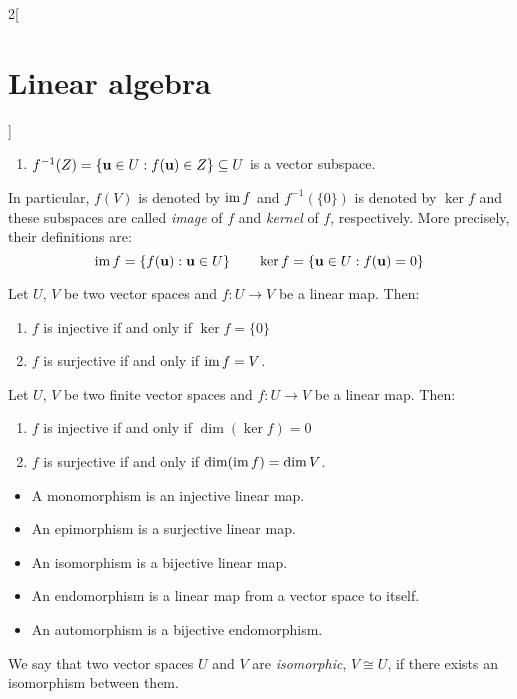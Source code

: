 \documentclass[../../../main.tex]{subfiles}
\begin{document}
\begin{multicols}{2}[\section{Linear algebra}]
\begin{prop}
\begin{enumerate}
      \item $f^{-1}(Z)=\{\boldsymbol{\mathrm{u}}\in U: f(\boldsymbol{\mathrm{u}})\in Z\}\subseteq U$ is a vector subspace.
    \end{enumerate}
    In particular, $f(V)$ is denoted by $\operatorname{im} f$ and $f^{-1}(\{0\})$ is denoted by $\ker f$ and these subspaces are called \emph{image} of $f$ and \emph{kernel} of $f$, respectively. More precisely, their definitions are:
    $$\operatorname{im} f=\{f(\boldsymbol{\mathrm{u}}): \boldsymbol{\mathrm{u}}\in U\}\qquad\ker f=\{\boldsymbol{\mathrm{u}}\in U: f(\boldsymbol{\mathrm{u}})=0\}$$
  \end{prop}
  \begin{prop}
    Let $U$, $V$ be two vector spaces and $f:U\rightarrow V$ be a linear map. Then:
    \begin{enumerate}
      \item $f$ is injective if and only if $\ker f=\{0\}$
      \item $f$ is surjective if and only if $\operatorname{im} f=V$.
    \end{enumerate}
  \end{prop}
  \begin{corollary}
    Let $U$, $V$ be two finite vector spaces and $f:U\rightarrow V$ be a linear map. Then:
    \begin{enumerate}
      \item $f$ is injective if and only if $\dim(\ker f)=0$
      \item $f$ is surjective if and only if $\dim(\operatorname{im} f)=\dim V$.
    \end{enumerate}
  \end{corollary}
  \begin{definition}
    \hfill
    \begin{itemize}
      \item A monomorphism is an injective linear map.
      \item An epimorphism is a surjective linear map.
      \item An isomorphism is a bijective linear map.
      \item An endomorphism is a linear map from a vector space to itself.
      \item An automorphism is a bijective endomorphism.
    \end{itemize}
  \end{definition}
  \begin{definition}
    We say that two vector spaces $U$ and $V$ are \emph{isomorphic}, $V\cong U$, if there exists an isomorphism between them.
  \end{definition}

\end{multicols}
\end{document}
